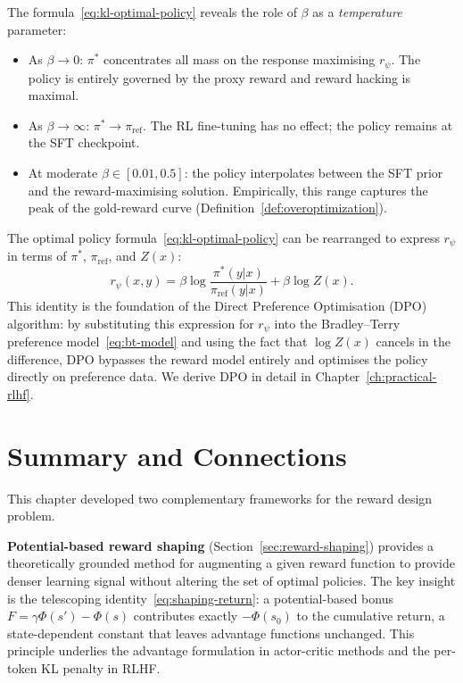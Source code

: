 The formula~\eqref{eq:kl-optimal-policy} reveals the role of $\beta$ as a \emph{temperature} parameter:
\begin{itemize}[leftmargin=*]
  \item As $\beta \to 0$: $\pi^*$ concentrates all mass on the response maximising $r_\psi$. The policy is entirely governed by the proxy reward and reward hacking is maximal.
  \item As $\beta \to \infty$: $\pi^* \to \pi_{\mathrm{ref}}$. The RL fine-tuning has no effect; the policy remains at the SFT checkpoint.
  \item At moderate $\beta \in [0.01, 0.5]$: the policy interpolates between the SFT prior and the reward-maximising solution. Empirically, this range captures the peak of the gold-reward curve (Definition~\ref{def:overoptimization}).
\end{itemize}

\begin{remark}
\label{rem:dpo-connection}
The optimal policy formula~\eqref{eq:kl-optimal-policy} can be rearranged to express $r_\psi$ in terms of $\pi^*$, $\pi_{\mathrm{ref}}$, and $Z(x)$:
\[
r_\psi(x, y) = \beta\log\frac{\pi^*(y|x)}{\pi_{\mathrm{ref}}(y|x)} + \beta\log Z(x).
\]
This identity is the foundation of the Direct Preference Optimisation (DPO) algorithm: by substituting this expression for $r_\psi$ into the Bradley--Terry preference model~\eqref{eq:bt-model} and using the fact that $\log Z(x)$ cancels in the difference, DPO bypasses the reward model entirely and optimises the policy directly on preference data. We derive DPO in detail in Chapter~\ref{ch:practical-rlhf}.
\end{remark}

\section{Summary and Connections}
\label{sec:ch10-summary}

This chapter developed two complementary frameworks for the reward design problem.

\textbf{Potential-based reward shaping} (Section~\ref{sec:reward-shaping}) provides a theoretically grounded method for augmenting a given reward function to provide denser learning signal without altering the set of optimal policies. The key insight is the telescoping identity~\eqref{eq:shaping-return}: a potential-based bonus $F = \gamma\Phi(s') - \Phi(s)$ contributes exactly $-\Phi(s_0)$ to the cumulative return, a state-dependent constant that leaves advantage functions unchanged. This principle underlies the advantage formulation in actor-critic methods and the per-token KL penalty in RLHF.

